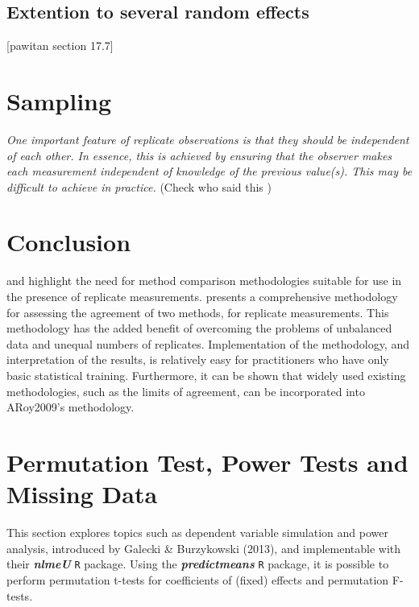 \documentclass[12pt, a4paper]{report}
\theoremstyle{plain}
\theoremstyle{definition}
\theoremstyle{remark}
\begin{document}
	
	\subsection{Extention to several random effects}
	[pawitan section 17.7]
	
	
	
	
	
	

	\section{Sampling}
	\emph{
		One important feature of replicate observations is that they should be independent
		of each other. In essence, this is achieved by ensuring that the observer makes each
		measurement independent of knowledge of the previous value(s). This may be difficult
		to achieve in practice.} (Check who said this
	)
	
	
	
	
	
	
	
	\section{Conclusion}
	\citet{BXC2008} and \citet{AARoy20092009} highlight the need for method comparison methodologies suitable for use in the presence of replicate measurements. \citet{AARoy20092009} presents a comprehensive methodology for assessing the agreement of two methods, for replicate measurements. This methodology has the added benefit of overcoming the problems of unbalanced data and unequal numbers of replicates. Implementation of the methodology, and interpretation of the results, is relatively easy for practitioners who have only basic statistical training. Furthermore, it can be shown that widely used existing methodologies, such as the limits of agreement, can be incorporated into ARoy2009's methodology.
	
	\section*{Permutation Test, Power Tests and Missing Data }
	
	This section explores topics such as dependent variable simulation and power analysis, introduced by Galecki \& Burzykowski (2013), and implementable with their \textbf{\textit{nlmeU}} \texttt{R} package.
	Using the \textbf{\textit{predictmeans}} \texttt{R} package, it is possible to perform permutation t-tests for coefficients of (fixed) effects and permutation F-tests.
	
\end{document}
